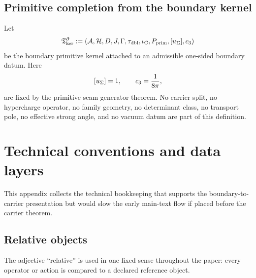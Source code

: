 \subsection{Primitive completion from the boundary kernel}

\begin{definition}
\label{def:boundary-primitive-kernel}
\label{def:post-carrier-primitive-kernel}
Let
\[
\mathfrak T_{\mathrm{ker}}^\partial
:=
(\mathcal A,\mathcal H,D,J,\Gamma,\tau_{\mathrm{dbl}},\iota_{\mathrm C},P_{\mathrm{prim}},[u_\Sigma],c_3)
\]
be the boundary primitive kernel attached to an admissible one-sided boundary datum. Here
\[
[u_\Sigma]=1,
\qquad
c_3=\frac{1}{8\pi},
\]
are fixed by the primitive seam generator theorem. No carrier split, no hypercharge operator, no
family geometry, no determinant class, no transport pole, no effective strong angle, and no
vacuum datum are part of this definition.
\end{definition}


\section{Technical conventions and data layers}
\label{app:tech}

This appendix collects the technical bookkeeping that supports the boundary-to-carrier presentation but would slow the early main-text flow if placed before the carrier theorem.

\subsection{Relative objects}

The adjective \enquote{relative} is used in one fixed sense throughout the paper: every operator or action is compared to a declared reference object.

